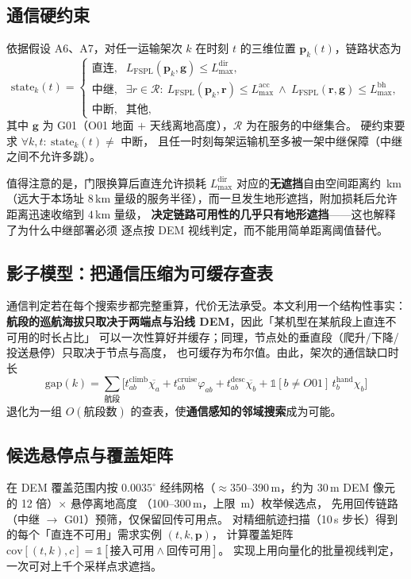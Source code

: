 \documentclass[12pt,a4paper,fontset=windows]{ctexart}
\begin{document}
\subsection{通信硬约束}
依据假设 A6、A7，对任一运输架次 $k$ 在时刻 $t$ 的三维位置 $\mathbf{p}_k(t)$，链路状态为
\begin{equation}
\mathrm{state}_k(t)=
\begin{cases}
\text{直连}, & L_{\mathrm{FSPL}}(\mathbf{p}_k,\mathbf{g})\le L_{\max}^{\mathrm{dir}},\\
\text{中继}, & \exists r\in\mathcal{R}:\ L_{\mathrm{FSPL}}(\mathbf{p}_k,\mathbf{r})\le L_{\max}^{\mathrm{acc}}
              \ \wedge\ L_{\mathrm{FSPL}}(\mathbf{r},\mathbf{g})\le L_{\max}^{\mathrm{bh}},\\
\text{中断}, & \text{其他},
\end{cases}
\end{equation}
其中 $\mathbf{g}$ 为 G01（O01 地面 $+$ 天线离地高度），$\mathcal{R}$ 为在服务的中继集合。
硬约束要求 $\forall k,t:\ \mathrm{state}_k(t)\ne$ 中断，
且任一时刻每架运输机至多被一架中继保障（中继之间不允许多跳）。

值得注意的是，门限换算后直连允许损耗 $L_{\max}^{\mathrm{dir}}$ 对应的\textbf{无遮挡}自由空间距离约 \DirectRange\,km（远大于本场址 $8$\,km 量级的服务半径），而一旦发生地形遮挡，附加损耗后允许距离迅速收缩到 $4$\,km 量级，
\textbf{决定链路可用性的几乎只有地形遮挡}——这也解释了为什么中继部署必须
逐点按 DEM 视线判定，而不能用简单距离阈值替代。

\subsection{影子模型：把通信压缩为可缓存查表}
通信判定若在每个搜索步都完整重算，代价无法承受。本文利用一个结构性事实：
\textbf{航段的巡航海拔只取决于两端点与沿线 DEM}，因此「某机型在某航段上直连不可用的时长占比」
可以一次性算好并缓存；同理，节点处的垂直段（爬升/下降/投送悬停）只取决于节点与高度，
也可缓存为布尔值。由此，架次的通信缺口时长
\begin{equation}
\mathrm{gap}(k)=\sum_{\text{航段}}\Big[t^{\mathrm{climb}}_{ab}\overline{\chi_a}+t^{\mathrm{cruise}}_{ab}\varphi_{ab}
+t^{\mathrm{desc}}_{ab}\overline{\chi_b}+\mathbb{1}[b\ne O01]\,t^{\mathrm{hand}}_b\chi_b\Big]
\end{equation}
退化为一组 $O(\text{航段数})$ 的查表，使\textbf{通信感知的邻域搜索}成为可能。

\subsection{候选悬停点与覆盖矩阵}\label{sec:q3cover}
在 DEM 覆盖范围内按 $0.0035^\circ$ 经纬网格（$\approx350$--$390$\,m，约为 30\,m DEM 像元的 12 倍）$\times$ 悬停离地高度
（100--300\,m，上限 \RelayAglMax\,m）枚举候选点，
先用回传链路（中继 $\to$ G01）预筛，仅保留回传可用点。
对精细航迹扫描（10\,s 步长）得到的每个「直连不可用」需求实例 $(t,k,\mathbf{p})$，
计算覆盖矩阵 $\mathrm{cov}[(t,k),c]=\mathbb{1}[\text{接入可用}\wedge\text{回传可用}]$。
实现上用向量化的批量视线判定，一次可对上千个采样点求遮挡。
\end{document}
